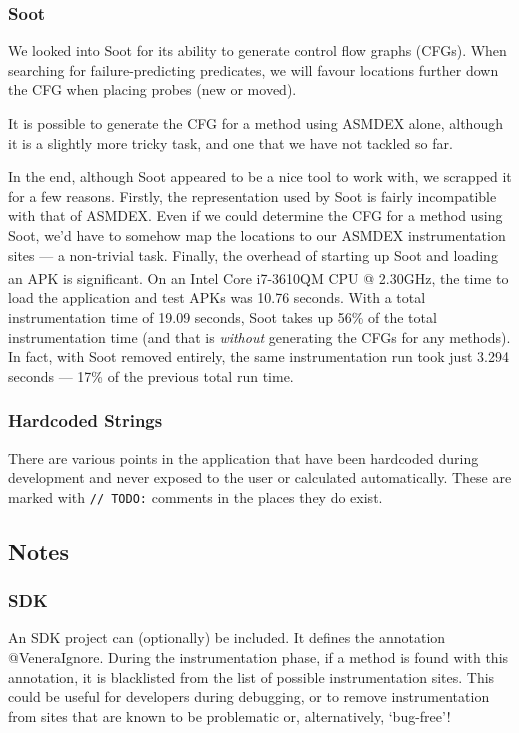\subsubsection{Soot}

We looked into Soot for its ability to generate control flow graphs (CFGs). When
searching for failure-predicting predicates, we will favour locations further
down the CFG when placing probes (new or moved).

It is possible to generate the CFG for a method using ASMDEX alone, although it
is a slightly more tricky task, and one that we have not tackled so far.

In the end, although Soot appeared to be a nice tool to work with, we scrapped
it for a few reasons. Firstly, the representation used by Soot is fairly
incompatible with that of ASMDEX. Even if we could determine the CFG for a
method using Soot, we'd have to somehow map the locations to our ASMDEX
instrumentation sites --- a non-trivial task. Finally, the overhead of starting
up Soot and loading an APK is significant. On an
Intel\textsuperscript{\textregistered} Core\textsuperscript{\texttrademark}
i7-3610QM CPU @ 2.30GHz, the time to load the application and test APKs was
10.76 seconds. With a total instrumentation time of 19.09 seconds, Soot takes up
56\% of the total instrumentation time (and that is \textit{without} generating
the CFGs for any methods). In fact, with Soot removed entirely, the same
instrumentation run took just 3.294 seconds --- 17\% of the previous total run
time.

\subsubsection{Hardcoded Strings}

There are various points in the application that have been hardcoded during
development and never exposed to the user or calculated automatically. These are
marked with \texttt{// TODO:} comments in the places they do exist.

\subsection{Notes}

\subsubsection{SDK}
\label{sec:sec:venera_sdk}

An SDK project can (optionally) be included. It defines the annotation
@VeneraIgnore. During the instrumentation phase, if a method is found with
this annotation, it is blacklisted from the list of possible instrumentation
sites. This could be useful for developers during debugging, or to remove
instrumentation from sites that are known to be problematic or, alternatively,
{\lq}bug-free{\rq}!

